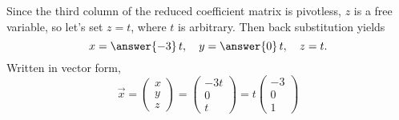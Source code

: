 \documentclass{ximera}
\begin{document}
\begin{example}
\begin{explanation}
\begin{enumerate}
      Since the third column of the reduced coefficient matrix is
      pivotless, $z$ is a free variable, so let's set $z = t$, where
      $t$ is arbitrary. Then back substitution yields
      \[
        x = \answer{-3}\,t,\quad y = \answer{0}\,t,\quad z = t.
      \]
      Written in vector form,
      \[
        \vec{x} =
        \begin{pmatrix}
          x \\ y \\ z
        \end{pmatrix}
        =
        \begin{pmatrix}
          -3t \\ 0 \\ t
        \end{pmatrix}
        = t
        \begin{pmatrix}
          -3 \\ 0 \\ 1

\end{pmatrix}\]
\end{enumerate}
\end{explanation}
\end{example}
\end{document}
